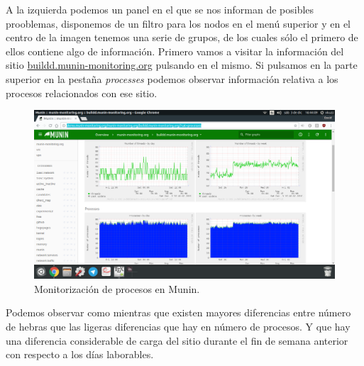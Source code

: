 A la izquierda podemos un panel en el que se nos informan de posibles prooblemas, disponemos de un filtro para los nodos en el menú superior y en el centro de la imagen tenemos una serie de grupos, de los cuales sólo el primero de ellos contiene algo de información. Primero vamos a visitar la información del sitio \url{buildd.munin-monitoring.org} pulsando en el mismo. Si pulsamos en la parte superior en la pestaña \textit{processes} podemos observar información relativa a los procesos relacionados con ese sitio. 
\begin{figure}[H]
	\centering
	\includegraphics[scale=0.3]{munin2.png}
	\caption{Monitorización de procesos en Munin.}
\end{figure}

Podemos observar como mientras que existen mayores diferencias entre número de hebras que las ligeras diferencias que hay en número de procesos. Y que hay una diferencia considerable de carga del sitio durante el fin de semana anterior con respecto a los días laborables.\linebreak\linebreak

